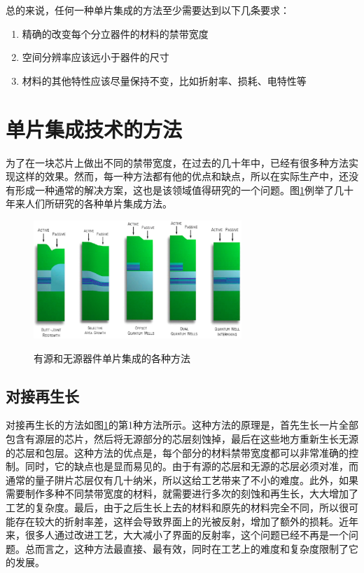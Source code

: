 \documentclass[oneside]{ZJUthesis}
\begin{document}
总的来说，任何一种单片集成的方法至少需要达到以下几条要求：

\begin{enumerate}
\item{精确的改变每个分立器件的材料的禁带宽度}
\item{空间分辨率应该远小于器件的尺寸}
\item{材料的其他特性应该尽量保持不变，比如折射率、损耗、电特性等}
\end{enumerate}

\section{单片集成技术的方法}

为了在一块芯片上做出不同的禁带宽度，在过去的几十年中，已经有很多种方法实现这样的效果。然而，每一种方法都有他的优点和缺点，所以在实际生产中，还没有形成一种通常的解决方案，这也是该领域值得研究的一个问题。图\ref{fig_pic_methods}例举了几十年来人们所研究的各种单片集成方法。

\begin{figure}[!h]
  \centering
  \includegraphics[width=0.7\textwidth]{./Pictures/pic_methods.eps}\\
  \caption{有源和无源器件单片集成的各种方法}
  \label{fig_pic_methods}
\end{figure}

\subsection{对接再生长}

对接再生长的方法如图\ref{fig_pic_methods}的第1种方法所示。这种方法的原理是，首先生长一片全部包含有源层的芯片，然后将无源部分的芯层刻蚀掉，最后在这些地方重新生长无源的芯层和包层。这种方法的优点是，每个部分的材料禁带宽度都可以非常准确的控制。同时，它的缺点也是显而易见的。由于有源的芯层和无源的芯层必须对准，而通常的量子阱片芯层仅有几十纳米，所以这给工艺带来了不小的难度。此外，如果需要制作多种不同禁带宽度的材料，就需要进行多次的刻蚀和再生长，大大增加了工艺的复杂度。最后，由于之后生长上去的材料和原先的材料完全不同，所以很可能存在较大的折射率差，这样会导致界面上的光被反射，增加了额外的损耗。近年来，很多人通过改进工艺，大大减小了界面的反射率，这个问题已经不再是一个问题。总而言之，这种方法最直接、最有效，同时在工艺上的难度和复杂度限制了它的发展。
\end{document}
